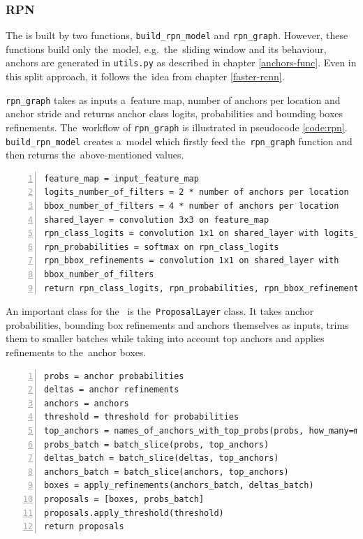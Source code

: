\subsubsection{RPN}
\label{model-rpn}

The  is built by two functions, \verb|build_rpn_model| and 
\verb|rpn_graph|. However, these functions build only the~model,
e.g.~the~sliding window and its behaviour, anchors are generated in \verb|utils.py| as 
described in chapter \ref{anchors-func}. Even in this split approach, it 
follows the~idea from chapter \ref{faster-rcnn}.

\verb|rpn_graph| takes as inputs a~feature map, number of anchors per location 
and anchor stride and returns anchor class logits, probabilities and bounding 
boxes refinements. The~workflow of \verb|rpn_graph| is illustrated in pseudocode 
\ref{code:rpn}. \verb|build_rpn_model| creates a~model which firstly feed
the~\verb|rpn_graph| function and then returns the~above-mentioned values.

{\scriptsize
\begin{lstlisting}[style=python, caption={rpn\_graph}, captionpos=b, 
label=code:rpn, deletekeywords={from, input, map},
backgroundcolor = \color{light-gray}, numbers=left, breaklines=true]
feature_map = input_feature_map
logits_number_of_filters = 2 * number of anchors per location
bbox_number_of_filters = 4 * number of anchors per location
shared_layer = convolution 3x3 on feature_map
rpn_class_logits = convolution 1x1 on shared_layer with logits_number_of_filters
rpn_probabilities = softmax on rpn_class_logits
rpn_bbox_refinements = convolution 1x1 on shared_layer with 
bbox_number_of_filters 
return rpn_class_logits, rpn_probabilities, rpn_bbox_refinements
\end{lstlisting}}

An important class for the~ is the~\verb|ProposalLayer| class. It takes 
anchor probabilities, bounding box refinements and anchors themselves as inputs, 
trims them to smaller batches while taking into account top anchors and applies 
refinements to the~anchor boxes.

{\scriptsize
\begin{lstlisting}[style=python, caption={ProposalLayer}, captionpos=b, 
label=code:prop-layer, deletekeywords={from, input, map, for},
backgroundcolor = \color{light-gray}, numbers=left, breaklines=true]
probs = anchor probabilities
deltas = anchor refinements
anchors = anchors
threshold = threshold for probabilities
top_anchors = names_of_anchors_with_top_probs(probs, how_many=min(6000, len(probs)))
probs_batch = batch_slice(probs, top_anchors)
deltas_batch = batch_slice(deltas, top_anchors)
anchors_batch = batch_slice(anchors, top_anchors)
boxes = apply_refinements(anchors_batch, deltas_batch)
proposals = [boxes, probs_batch]
proposals.apply_threshold(threshold)
return proposals
\end{lstlisting}}

